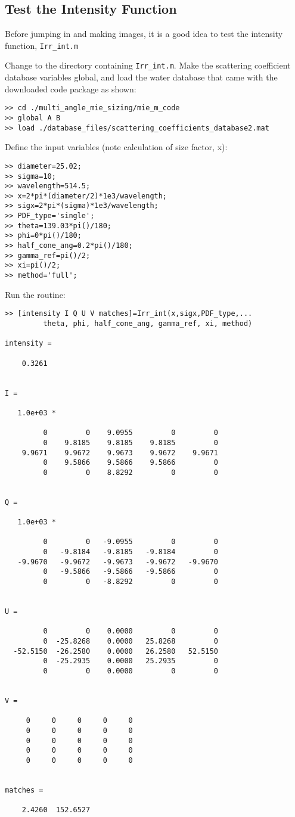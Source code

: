 \subsection{Test the Intensity Function}
Before jumping in and making images, it is a good idea to test the intensity function, \texttt{Irr\_int.m}

Change to the directory containing \texttt{Irr\_int.m}.  Make the scattering coefficient database variables global, and load the water database that came with the downloaded code package as shown:

\begin{verbatim}
>> cd ./multi_angle_mie_sizing/mie_m_code
>> global A B
>> load ./database_files/scattering_coefficients_database2.mat
\end{verbatim}
Define the input variables (note calculation of size factor, x):
\begin{verbatim}
>> diameter=25.02;
>> sigma=10;
>> wavelength=514.5;
>> x=2*pi*(diameter/2)*1e3/wavelength;
>> sigx=2*pi*(sigma)*1e3/wavelength;
>> PDF_type='single';
>> theta=139.03*pi()/180;
>> phi=0*pi()/180;
>> half_cone_ang=0.2*pi()/180;
>> gamma_ref=pi()/2;
>> xi=pi()/2;
>> method='full';
\end{verbatim}
Run the routine:
\begin{verbatim}
>> [intensity I Q U V matches]=Irr_int(x,sigx,PDF_type,...
         theta, phi, half_cone_ang, gamma_ref, xi, method)

intensity =

    0.3261


I =

   1.0e+03 *

         0         0    9.0955         0         0
         0    9.8185    9.8185    9.8185         0
    9.9671    9.9672    9.9673    9.9672    9.9671
         0    9.5866    9.5866    9.5866         0
         0         0    8.8292         0         0


Q =

   1.0e+03 *

         0         0   -9.0955         0         0
         0   -9.8184   -9.8185   -9.8184         0
   -9.9670   -9.9672   -9.9673   -9.9672   -9.9670
         0   -9.5866   -9.5866   -9.5866         0
         0         0   -8.8292         0         0


U =

         0         0    0.0000         0         0
         0  -25.8268    0.0000   25.8268         0
  -52.5150  -26.2580    0.0000   26.2580   52.5150
         0  -25.2935    0.0000   25.2935         0
         0         0    0.0000         0         0


V =

     0     0     0     0     0
     0     0     0     0     0
     0     0     0     0     0
     0     0     0     0     0
     0     0     0     0     0


matches =

    2.4260  152.6527

\end{verbatim}

